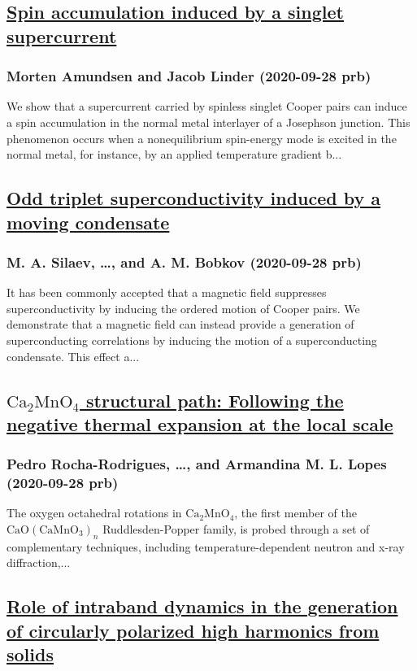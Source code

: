 \subsection*{\href{http://link.aps.org/doi/10.1103/PhysRevB.102.100506}{Spin accumulation induced by a singlet supercurrent}}
\subsubsection*{Morten Amundsen and Jacob Linder (2020-09-28 prb)}
We show that a supercurrent carried by spinless singlet Cooper pairs can induce a spin accumulation in the normal metal interlayer of a Josephson junction. This phenomenon occurs when a nonequilibrium spin-energy mode is excited in the normal metal, for instance, by an applied temperature gradient b...
\subsection*{\href{http://link.aps.org/doi/10.1103/PhysRevB.102.100507}{Odd triplet superconductivity induced by a moving condensate}}
\subsubsection*{M. A. Silaev, \dots, and A. M. Bobkov (2020-09-28 prb)}
It has been commonly accepted that a magnetic field suppresses superconductivity by inducing the ordered motion of Cooper pairs. We demonstrate that a magnetic field can instead provide a generation of superconducting correlations by inducing the motion of a superconducting condensate. This effect a...
\subsection*{\href{http://link.aps.org/doi/10.1103/PhysRevB.102.104115}{${\mathrm{Ca}}_{2}\mathrm{Mn}{\mathrm{O}}_{4}$ structural path: Following the negative thermal expansion at the local scale}}
\subsubsection*{Pedro Rocha-Rodrigues, \dots, and Armandina M. L. Lopes (2020-09-28 prb)}
The oxygen octahedral rotations in ${\mathrm{Ca}}_{2}\mathrm{Mn}{\mathrm{O}}_{4}$, the first member of the $\mathrm{Ca}\mathrm{O}{({\mathrm{CaMnO}}_{3})}_{n}$ Ruddlesden-Popper family, is probed through a set of complementary techniques, including temperature-dependent neutron and x-ray diffraction,...
\subsection*{\href{http://link.aps.org/doi/10.1103/PhysRevB.102.104308}{Role of intraband dynamics in the generation of circularly polarized high harmonics from solids}}
